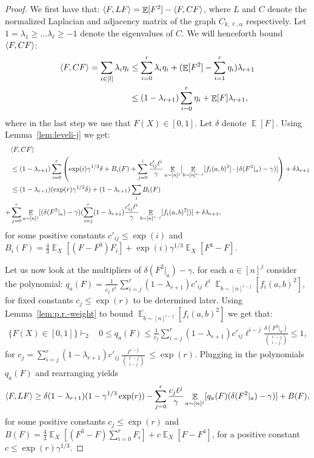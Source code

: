 \documentclass[11pt]{article}
\DeclareMathOperator*{\E}{\mathbb{E}}
\DeclarePairedDelimiter\ip{\langle}{\rangle}
\theoremstyle{definition}
\begin{document}
\begin{proof}
We first have that: $\ip{F, LF} = \E[F^{ 2}]  - \ip{F,CF}$, where $L$ and $C$ denote the normalized Laplacian and adjacency matrix of the graph $C_{k,\ell,\alpha}$ respectively. Let $1=\lambda_1 \geq \ldots \lambda_\ell \geq -1$ denote the eigenvalues of $C$. We will henceforth bound $\ip{F,CF}$:
\begin{align*}
\ip{F,CF} = \sum_{i \in [l]} \lambda_i \eta_i 
&\leq \sum_{i = 0}^r \lambda_i\eta_i + (\E[F^{ 2}] - \sum_{i=1}^r \eta_i)\lambda_{r+1} \\
&\leq (1 - \lambda_{r+1}) \sum_{i=0}^r \eta_i + \E[F]\lambda_{r+1},\\
\end{align*}
where in the last step we use that $F(X) \in [0,1]$. Let $\delta$ denote $\E[F]$. Using Lemma~\ref{lem:leveli-j} we get: 
\begin{align}
&\ip{F,CF} \notag\\
&\leq (1 - \lambda_{r+1})\sum_{i=0}^r \left(\exp(i)\gamma^{1/3}\delta + B_{i}(F)+ \sum_{j = 0}^i  \frac{c'_{ij}\ell^{i}}{\gamma}\E_{a \sim [n]^{j}}[\E_{b \sim [n]^{i-j}}[f_i(a,b)^2]\cdot (\delta(F^{2}|_a) - \gamma)] \right) + \delta\lambda_{r+1} \notag\\
&\leq (1 - \lambda_{r+1})(\exp(r)\gamma^{1/3}\delta) + (1-\lambda_{r+1})\sum_i B_i(F) \notag\\+ &\sum_{j = 0}^r  \E_{a \sim [n]^{j}}[ (\delta(F^{ 2}|_a) - \gamma)(\sum_{i = j}^r (1 - \lambda_{r+1})\frac{c'_{ij} \ell^{i}}{\gamma} \E_{b \sim [n]^{i-j}}[f_i(a,b)^2])] +  \delta\lambda_{r+1}, \notag
\end{align}
for some positive constants $c'_{ij} \leq \exp(i)$ and $B_i(F) =  \frac{4}{3}\E_X[(F - F^{ 3})F_i] + \exp(i)\gamma^{1/3}\E_X[F^{ 4} - F]$.

Let us now look at the multipliers of $\delta(F^{2}|_a) - \gamma$, for each $a \in [n]^j$ consider the polynomial: $q_a(F) = \frac{1}{c_j\ell^j}\sum_{i = j}^r (1 - \lambda_{r+1})c'_{ij} \ell^{i} \E_{b \sim [n]^{i-j}}[f_i(a,b)^2]$, for fixed constants $c_j \leq \exp(r)$ to be determined later. Using Lemma~\ref{lem:p.r.-weight} to bound $\E_{b \sim [n]^{i-j}}[f_i(a,b)^2]$ we get that:
\begin{align*}
\{F(X) \in [0,1]\} \vdash_2 ~~~~0 \leq q_a(F) \leq \frac{1}{c_j}\sum_{i = j}^r (1 - \lambda_{r+1})c'_{ij}\ell^{i-j} \frac{ \delta(F^{2}|_a)}{{\ell - j \choose i - j}} \leq 1,
\end{align*}
for $c_j = \sum_{i = j}^r (1 - \lambda_{r+1})c'_{ij}\frac{\ell^{i-j}}{{\ell - j \choose i-j}} \leq \exp(r)$. Plugging in the polynomials $q_a(F)$ and rearranging yields
\[\ip{F,LF} \geq \delta(1 - \lambda_{r+1})(1- \gamma^{1/3}\exp(r)) - \sum_{j = 0}^r  \frac{c_j\ell^{j}}{\gamma}\E_{a \sim [n]^{j}}[q_a(F)(\delta(F^{ 2}|_a) - \gamma)] + B(F),\]
for some positive constants $c_j \leq \exp(r)$ and $B(F) = \frac{4}{3}\E_X[(F^{ 3} - F)\sum_{i = 0}^r F_i] + c\E_X[F - F^{ 4}]$, for a positive constant $c \leq \exp(r)\gamma^{1/3}$. 


\end{proof}
\end{document}
